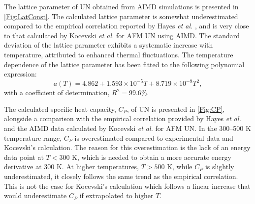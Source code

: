 \documentclass[preprint, 12pt]{elsarticle}
\newcommand{\?}{\stackrel{?}{=}}
\begin{document}
The lattice parameter of UN obtained from AIMD simulations is presented in \cref{Fig:LatConst}. The calculated lattice parameter is somewhat underestimated compared to the empirical correlation reported by Hayes \textit{et al.} \cite{Hayes1990I}, and is very close to that calculated by Kocevski \textit{et al.} \cite{Kocevski2023} for AFM UN using AIMD. The standard deviation of the lattice parameter exhibits a systematic increase with temperature, attributed to enhanced thermal fluctuations. The temperature dependence of the lattice parameter has been fitted to the following polynomial expression:
\begin{equation}
a(T) = 4.862 + 1.593 \times 10^{-5} T + 8.719 \times 10^{-9} T^2,    
\end{equation}
with a coefficient of determination, \(R^2 = 99.6\%\).

The calculated specific heat capacity, $C_P$, of UN is presented in \cref{Fig:CP}, alongside a comparison with the empirical correlation provided by Hayes \textit{et al.} \cite{Hayes1990IV} and the AIMD data calculated by Kocevski \textit{et al.} \cite{Kocevski2023} for AFM UN. In the 300–500 K temperature range, $C_P$ is overestimated compared to experimental data and Kocevski's calculation. The reason for this overestimation is the lack of an energy data point at $T < 300$ K, which is needed to obtain a more accurate energy derivative at 300 K. At higher temperatures, $T > 500$ K, while \( C_P \) is slightly underestimated, it closely follows the same trend as the empirical correlation. This is not the case for Kocevski's calculation which follows a linear increase that would underestimate $C_P$ if extrapolated to higher $T$.
\end{document}
